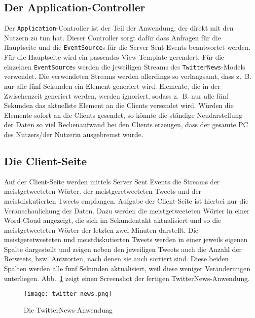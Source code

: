 \subsection{Der Application-Controller} %
\label{sub:der_application_controller}

Der \lstinline|Application|-Controller ist der Teil der Anwendung, der direkt mit den Nutzern zu tun hat.
Dieser Controller sorgt dafür dass Anfragen für die Hauptseite und die \lstinline|EventSource|s für die Server Sent Events beantwortet werden.
Für die Hauptseite wird ein passendes View-Template gerendert.
Für die einzelnen \lstinline|EventSource|s werden die jeweiligen Streams des \lstinline|TwitterNews|-Models verwendet.
Die verwendeten Streams werden allerdings so verlangsamt, dass z.~B. nur alle fünf Sekunden ein Element generiert wird.
Elemente, die in der Zwischenzeit generiert werden, werden ignoriert, sodass z.~B. nur alle fünf Sekunden das aktuellste Element an die Clients versendet wird.
Würden die Elemente sofort an die Clients gesendet, so könnte die ständige Neudarstellung der Daten so viel Rechenaufwand bei den Clients erzeugen, dass der gesamte PC des Nutzers/der Nutzerin ausgebremst würde.


\subsection{Die Client-Seite} %
\label{sub:die_client_seite}

Auf der Client-Seite werden mittels Server Sent Events die Streams der meistgetweeteten Wörter, der meistgeretweeteten Tweets und der meistdiskutierten Tweets empfangen.
Aufgabe der Client-Seite ist hierbei nur die Veranschaulichung der Daten.
Dazu werden die meistgetweeteten Wörter in einer Word-Cloud angezeigt, die sich im Sekundentakt aktualisiert und so die meistgetweeteten Wörter der letzten zwei Minuten darstellt.
Die meistgeretweeteten und meistdiskutierten Tweets werden in einer jeweils eigenen Spalte dargestellt und zeigen neben den jeweiligen Tweets auch die Anzahl der Retweets, bzw. Antworten, nach denen sie auch sortiert sind.
Diese beiden Spalten werden alle fünf Sekunden aktualisiert, weil diese weniger Veränderungen unterliegen.
Abb.~\ref{fig:die_twitternews_anwendung} zeigt einen Screenshot der fertigen TwitterNews-Anwendung.

\begin{figure}[h]
\centering
\texttt{[image: twitter\_news.png]}
\caption{Die TwitterNews-Anwendung}
\label{fig:die_twitternews_anwendung}
\end{figure}



